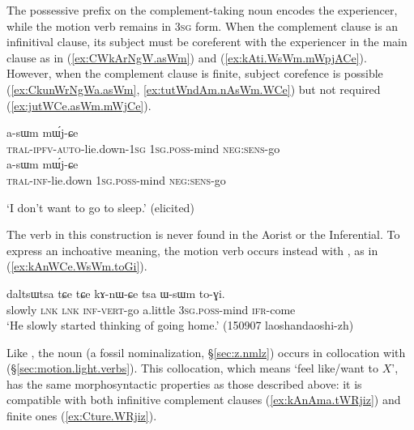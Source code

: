 The possessive prefix on the com\-ple\-ment-taking noun encodes the experiencer, while the motion verb  remains in \textsc{3sg} form. When the complement clause is an infinitival clause, its subject must be coreferent with the experiencer in the main clause as in (\ref{ex:CWkArNgW.asWm}) and (\ref{ex:kAti.WsWm.mWpjACe}). However, when the complement clause is finite, subject corefence is possible (\ref{ex:CkunWrNgWa.asWm}, \ref{ex:tutWndAm.nAsWm.WCe}) but not required (\ref{ex:jutWCe.asWm.mWjCe}).

\begin{exe}
\ex 
\begin{xlist}
\ex  \label{ex:CkunWrNgWa.asWm}
\gll [ɕ-ku-nɯ-rŋgɯ-a] a-sɯm mɯ́j-ɕe \\
\textsc{tral}-\textsc{ipfv}-\textsc{auto}-lie.down-\textsc{1sg} \textsc{1sg}.\textsc{poss}-mind \textsc{neg}:\textsc{sens}-go \\
\ex  \label{ex:CWkArNgW.asWm}
\gll [ɕɯ-kɤ-rŋgɯ] a-sɯm mɯ́j-ɕe \\
\textsc{tral}-\textsc{inf}-lie.down \textsc{1sg}.\textsc{poss}-mind \textsc{neg}:\textsc{sens}-go \\
\end{xlist}
\glt `I don't want to go to sleep.' (elicited)
\end{exe}

The verb  in this construction is never found in the Aorist or the Inferential. To express an inchoative meaning, the motion verb  occurs instead with , as in (\ref{ex:kAnWCe.WsWm.toGi}).

\begin{exe}
\ex  \label{ex:kAnWCe.WsWm.toGi}
\gll daltsɯtsa tɕe tɕe kɤ-nɯ-ɕe tsa ɯ-sɯm to-ɣi.  \\
slowly \textsc{lnk} \textsc{lnk} \textsc{inf}-\textsc{vert}-go a.little \textsc{3sg}.\textsc{poss}-mind \textsc{ifr}-come \\
\glt `He slowly started thinking of going home.' (150907 laoshandaoshi-zh)
\end{exe}

Like , the noun  (a fossil  nominalization, §\ref{sec:z.nmlz}) occurs in collocation with  (§\ref{sec:motion.light.verbs}). This collocation, which means `feel like/want to $X$', has the same morphosyntactic properties as those described above: it is compatible with both infinitive complement clauses (\ref{ex:kAnAma.tWRjiz}) and finite ones (\ref{ex:Cture.WRjiz}).

